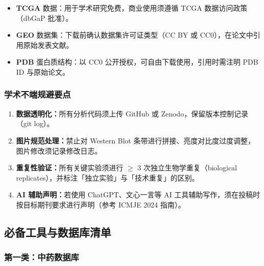 \documentclass[12pt,a4paper,twoside]{article}
\newcommand{\database}[1]{\textbf{\textsf{#1}}}
\begin{document}
\begin{itemize}
  \item \database{TCGA} 数据：用于学术研究免费，商业使用须遵循 TCGA 数据访问政策（dbGaP 批准）。
  \item \database{GEO} 数据集：下载前确认数据集许可证类型（CC BY 或 CC0），在论文中引用原始发表文献。
  \item \database{PDB} 蛋白质结构：以 CC0 公开授权，可自由下载使用，引用时需注明 PDB ID 与原始论文。
\end{itemize}

\subsubsection{学术不端规避要点}

\begin{enumerate}
  \item \textbf{数据透明化：}所有分析代码须上传 GitHub 或 Zenodo，保留版本控制记录（git log）。
  \item \textbf{图片规范处理：}禁止对 Western Blot 条带进行拼接、亮度对比度过度调整，图片修改须记录修改日志。
  \item \textbf{重复性验证：}所有关键实验须进行 $\geq$ 3 次独立生物学重复（biological replicates），并标注「独立实验」与「技术重复」的区别。
  \item \textbf{AI 辅助声明：}若使用 ChatGPT、文心一言等 AI 工具辅助写作，须在投稿时按目标期刊要求进行声明（参考 ICMJE 2024 指南）。
\end{enumerate}

\subsection{必备工具与数据库清单}
\label{sec:module1_tools}

\subsubsection{第一类：中药数据库}
\end{document}
